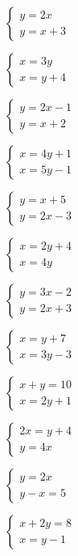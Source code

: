 \documentclass[12pt,a4paper]{article}
\begin{document}
\begin{enumerate}[label=\alph*), itemsep=1.2cm]
    \begin{minipage}[t]{0.45\textwidth}
    \item $\begin{cases} y = 2x \\ y = x + 3 \end{cases}$
    \item $\begin{cases} x = 3y \\ x = y + 4 \end{cases}$
    \item $\begin{cases} y = 2x - 1 \\ y = x + 2 \end{cases}$
    \item $\begin{cases} x = 4y + 1 \\ x = 5y - 1 \end{cases}$
    \item $\begin{cases} y = x + 5 \\ y = 2x - 3 \end{cases}$
    \item $\begin{cases} x = 2y + 4 \\ x = 4y \end{cases}$
    \end{minipage}
    \begin{minipage}[t]{0.45\textwidth}
    \item $\begin{cases} y = 3x - 2 \\ y = 2x + 3 \end{cases}$
    \item $\begin{cases} x = y + 7 \\ x = 3y - 3 \end{cases}$
    
    \item $\begin{cases} x + y = 10 \\ x = 2y + 1 \end{cases}$
    \item $\begin{cases} 2x = y + 4 \\ y = 4x \end{cases}$
    \item $\begin{cases} y = 2x \\ y - x = 5 \end{cases}$
    \item $\begin{cases} x + 2y = 8 \\ x = y - 1 \end{cases}$
    \end{minipage}
\end{enumerate}
\end{document}
